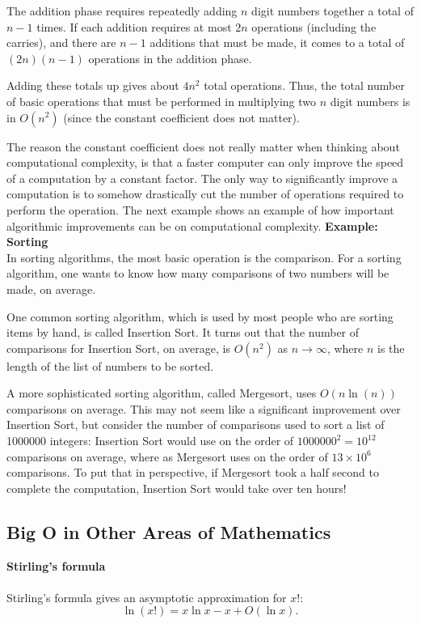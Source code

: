 \documentclass[twoside,openright,titlepage,a4paper]{book}
\begin{document}
\begin{sloppypar}
The addition phase requires repeatedly adding $n$ digit numbers together a total of $n-1$ times. If each addition requires at most $2n$ operations (including the carries), and there are $n-1$ additions that must be made, it comes to a total of $(2n)(n-1)$ operations in the addition phase.

Adding these totals up gives about $4n^2$ total operations. Thus, the total number of basic operations that must be performed in multiplying two $n$ digit numbers is in $O(n^2)$ (since the constant coefficient does not matter).

The reason the constant coefficient does not really matter when thinking about computational complexity, is that a faster computer can only improve the speed of a computation by a constant factor. The only way to significantly improve a computation is to somehow drastically cut the number of operations required to perform the operation. The next example shows an example of how important algorithmic improvements can be on computational complexity.
\bigbreak
\noindent \textbf{Example: Sorting}\\

In sorting algorithms, the most basic operation is the comparison. For a sorting algorithm, one wants to know how many comparisons of two numbers will be made, on average.

One common sorting algorithm, which is used by most people who are sorting items by hand, is called Insertion Sort. It turns out that the number of comparisons for Insertion Sort, on average, is $O(n^2)$ as $n \rightarrow \infty$, where $n$ is the length of the list of numbers to be sorted.

A more sophisticated sorting algorithm, called Mergesort, uses $O(n\ln(n))$ comparisons on average. This may not seem like a significant improvement over Insertion Sort, but consider the number of comparisons used to sort a list of 1000000 integers: Insertion Sort would use on the order of $1000000^2 = 10^{12}$ comparisons on average, where as Mergesort uses on the order of $13 \times 10^6$ comparisons. To put that in perspective, if Mergesort took a half second to complete the computation, Insertion Sort would take over ten hours!

\subsection{Big O in Other Areas of Mathematics}
\bigbreak
\noindent \textbf{Stirling's formula}\\\\
Stirling's formula gives an asymptotic approximation for $x!$: \[ \ln (x!) = x \ln x - x + O(\ln x). \]


\end{sloppypar}
\end{document}
